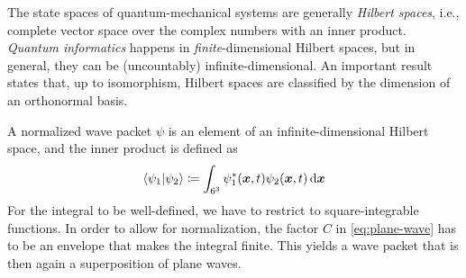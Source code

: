 \begin{interlude}\label{interlude:hilbert-spaces}
The state spaces of quantum-mechanical systems are generally \emph{Hilbert spaces}, i.e., complete vector space over the complex numbers with an inner product.
\emph{Quantum informatics} happens in \emph{finite}-dimensional Hilbert spaces, but in general, they can be (uncountably) infinite-dimensional.
%
An important result states that, up to isomorphism, Hilbert spaces are classified by the dimension of an orthonormal basis.

A normalized wave packet $\psi$ is an element of an infinite-dimensional Hilbert space, and the inner product is defined as
\begin{equation}\label{eq:inner-product}
\braket{\psi_1 | \psi_2} 
\coloneq
\int_{6^3} \psi_1^*({\boldsymbol{x}}, t) \psi_2({\boldsymbol{x}}, t)\,\mathrm{d}{\boldsymbol{x}}
\end{equation}
For the integral to be well-defined, we have to restrict to square-integrable functions.
In order to allow for normalization, the factor $C$ in \eqref{eq:plane-wave} has to be an envelope that makes the integral finite.
This yields a wave packet that is then again a superposition of plane waves.
\end{interlude}




